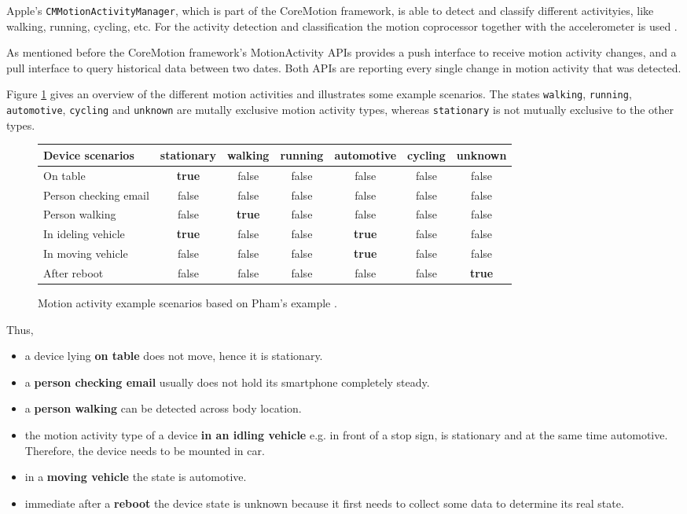 Apple's \texttt{CMMotionActivityManager}, which is part of the CoreMotion framework, is able to detect and classify different activityies, like walking, running, cycling, etc.
For the activity detection and classification the motion coprocessor together with the accelerometer is used \cite{wwdc_2014}.

As mentioned before the CoreMotion framework's MotionActivity \acsp{API} provides a push interface to receive motion activity changes, and a pull interface to query historical data between two dates.
Both \acsp{API} are reporting every single change in motion activity that was detected.

Figure \ref{fig:motionActivity} gives an overview of the different motion activities and illustrates some example scenarios.
The states \texttt{walking}, \texttt{running}, \texttt{automotive}, \texttt{cycling} and \texttt{unknown} are mutally exclusive motion activity types, whereas \texttt{stationary} is not mutually exclusive to the other types.

\begin{center}
\begin{figure}
\begin{tabular}{l*{6}{c}}
Device scenarios & stationary & walking & running & automotive & cycling & unknown \\
\hline
On table & \textbf{true} & false & false & false & false & false\\
Person checking email & false & false & false & false & false & false\\
Person walking & false & \textbf{true} & false & false & false & false\\
In ideling vehicle & \textbf{true} & false & false & \textbf{true} & false & false\\
In moving vehicle & false & false & false & \textbf{true} & false & false\\
After reboot & false & false & false & false & false & \textbf{true}
\end{tabular}
\caption{Motion activity example scenarios based on Pham's example \cite{wwdc_2014}.}
\label{fig:motionActivity}
\end{figure}
\end{center}

Thus,
\begin{itemize}
  \item a device lying \textbf{on table} does not move, hence it is stationary.
  \item a \textbf{person checking email}  usually does not hold its smartphone completely steady.
  \item a \textbf{person walking} can be detected across body location.
  \item the motion activity type of a device \textbf{in an idling vehicle} e.g. in front of a stop sign, is stationary and at the same time automotive. Therefore, the device needs to be mounted in car.
  \item in a \textbf{moving vehicle} the state is  automotive.
  \item immediate after a \textbf{reboot} the device state is unknown because it first needs to collect some data to determine its real state.
\end{itemize}

